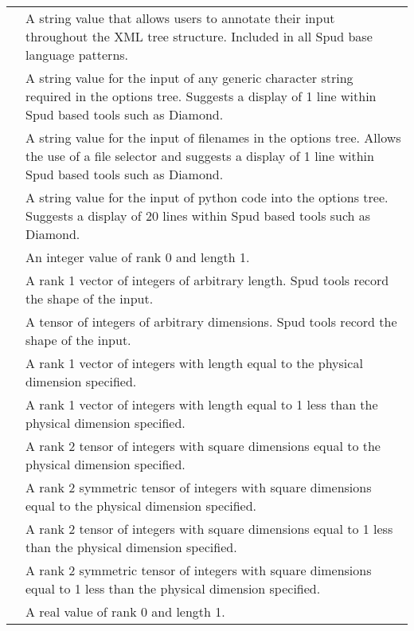 \documentclass[a4paper, 11pt]{book}
\begin{document}
\noindent\begin{tabular}{lp{8cm}}
\lstinline *comment* & A string value that allows users to annotate their input throughout the XML tree structure.  Included in all Spud base language patterns. \\
\lstinline *anystring* & A string value for the input of any generic character string required in the options tree.  Suggests a display of 1 line within Spud based tools such as Diamond. \\
\lstinline *filename* & A string value for the input of filenames in the options tree.  Allows the use of a file selector and suggests a display of 1 line within Spud based tools such as Diamond. \\
\lstinline *python_code* & A string value for the input of python code into the options tree.  Suggests a display of 20 lines within Spud based tools such as Diamond. \\
\lstinline *integer* & An integer value of rank 0 and length 1. \\
\lstinline *integer_vector* & A rank 1 vector of integers of arbitrary length.  Spud tools record the shape of the input. \\
\lstinline *integer_tensor* & A tensor of integers of arbitrary dimensions.  Spud tools record the shape of the input. \\
\lstinline *integer_dim_vector* & A rank 1 vector of integers with length equal to the physical dimension specified. \\
\lstinline *integer_dim_minus_one_vector* & A rank 1 vector of integers with length equal to 1 less than the physical dimension specified. \\
\lstinline *integer_dim_tensor* & A rank 2 tensor of integers with square dimensions equal to the physical dimension specified. \\
\lstinline *integer_dim_symmetric_tensor* & A rank 2 symmetric tensor of integers with square dimensions equal to the physical dimension specified. \\
\lstinline *integer_dim_minus_one_tensor* & A rank 2 tensor of integers with square dimensions equal to 1 less than the physical dimension specified. \\
\lstinline *integer_dim_minus_one_symmetric_tensor* & A rank 2 symmetric tensor of integers with square dimensions equal to 1 less than the physical dimension specified. \\
\lstinline *real* & A real value of rank 0 and length 1. \\

\end{tabular}
\end{document}

